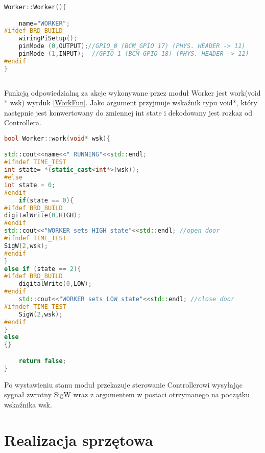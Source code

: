 \begin{lstlisting}[caption = {Konstruktor klasy Worker.}, label=Worker, language=C++]
Worker::Worker(){

	name="WORKER";
#ifdef BRD_BUILD
	wiringPiSetup();
	pinMode (0,OUTPUT);//GPIO_0 (BCM_GPIO 17) (PHYS. HEADER -> 11)
	pinMode (1,INPUT);	//GPIO_1 (BCM_GPIO 18) (PHYS. HEADER -> 12)
#endif
}
     
\end{lstlisting}

Funkcją odpowiedzialną za akcje wykonywane przez moduł Worker jest work(void * wsk) wyrduk \ref{WorkFun}. Jako argument przyjmuje wskaźnik typu void*, który następnie jest konwertowany do zmiennej int state i dekodowany jest rozkaz od Controllera.

\begin{lstlisting}[caption = {Funkcja work klasy Worker}, label=WorkFun, language=C++]
bool Worker::work(void* wsk){

std::cout<<name<<" RUNNING"<<std::endl;
#ifndef TIME_TEST
int state= *(static_cast<int*>(wsk));
#else
int state = 0;
#endif
	if(state == 0){
#ifdef BRD_BUILD
digitalWrite(0,HIGH);
#endif
std::cout<<"WORKER sets HIGH state"<<std::endl; //open door
#ifndef TIME_TEST
SigW(2,wsk);
#endif
}
else if (state == 2){
#ifdef BRD_BUILD
	digitalWrite(0,LOW);
#endif
	std::cout<<"WORKER sets LOW state"<<std::endl; //close door
#ifndef TIME_TEST
	SigW(2,wsk);
#endif
}
else
{}

	return false;
}

\end{lstlisting}

Po wystawieniu stanu moduł przekazuje sterowanie Controllerowi wysyłając sygnał zwrotny SigW wraz z argumentem w postaci otrzymanego na początku wskaźnika wsk.

\section{Realizacja sprzętowa }
